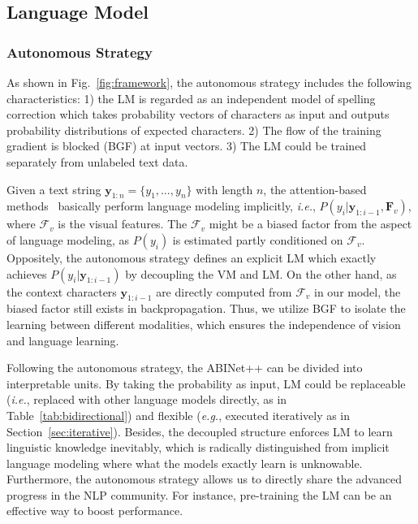 \documentclass[10pt,journal,compsoc]{IEEEtran}
\def\ie{{\it i.e.}\xspace}
\def\eg{{\it e.g.}\xspace}
\begin{document}
\subsection{Language Model}
\subsubsection{Autonomous Strategy}
\label{sec:autonomous}

As shown in Fig.~\ref{fig:framework}, the autonomous strategy includes the following characteristics: 1) the LM is regarded as an independent model of spelling correction which takes probability vectors of characters as input and outputs probability distributions of expected characters. 2) The flow of the training gradient is blocked (BGF) at input vectors. 3) The LM could be trained separately from unlabeled text data.


Given a text string $\bm{y}_{1:n}=\{y_1, \ldots, y_n\}$ with length $n$, the attention-based methods~\cite{lee2016recursive,shi2018aster,cheng2017focusing,li2019show,sheng2019nrtr} basically perform language modeling implicitly, \ie, $P(y_i|\bm{y}_{1:{i-1}}, \mathcal{\bm{F}}_{v})$, where $\mathcal{F}_{v}$ is the visual features. The $\mathcal{F}_{v}$ might be a biased factor from the aspect of language modeling, as $P(y_i)$ is estimated partly conditioned on $\mathcal{F}_{v}$. Oppositely, the autonomous strategy defines an explicit LM which exactly achieves $P(y_i|\bm{y}_{1:{i-1}})$ by decoupling the VM and LM. On the other hand, as the context characters $\bm{y}_{1:{i-1}}$ are directly computed from $\mathcal{F}_{v}$ in our model, the biased factor still exists in backpropagation. Thus, we utilize BGF to isolate the learning between different modalities, which ensures the independence of vision and language learning.


Following the autonomous strategy, the ABINet++ can be divided into interpretable units. By taking the probability as input, LM could be replaceable (\ie, replaced with other language models directly, as in Table~\ref{tab:bidirectional}) and flexible (\eg, executed iteratively as in Section~\ref{sec:iterative}). Besides, the decoupled structure enforces LM to learn linguistic knowledge inevitably, which is radically distinguished from implicit language modeling where what the models exactly learn is unknowable. Furthermore, the autonomous strategy allows us to directly share the advanced progress in the NLP community. For instance, pre-training the LM can be an effective way to boost performance.
\end{document}

